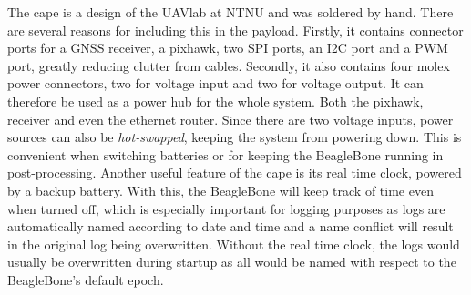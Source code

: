     The cape is a design of the UAVlab at NTNU and was soldered by hand. There are several reasons for including this in the payload. Firstly, it contains connector ports for a GNSS receiver, a pixhawk, two SPI ports, an I2C port and a PWM port, greatly reducing clutter from cables. Secondly, it also contains four molex power connectors, two for voltage input and two for voltage output. It can therefore be used as a power hub for the whole system. Both the pixhawk, receiver and even the ethernet router. Since there are two voltage inputs, power sources can also be \textit{hot-swapped}, keeping the system from powering down. This is convenient when switching batteries or for keeping the BeagleBone running in post-processing. Another useful feature of the cape is its real time clock, powered by a backup battery. With this, the BeagleBone will keep track of time even when turned off, which is especially important for logging purposes as logs are automatically named according to date and time and a name conflict will result in the original log being overwritten. Without the real time clock, the logs would usually be overwritten during startup as all would be named with respect to the BeagleBone's default epoch.\\
    
